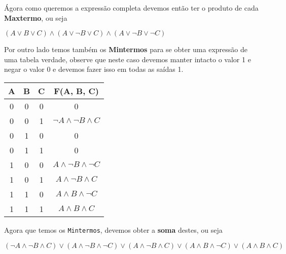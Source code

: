 \documentclass[12pt, onecolumn]{article}
\begin{document}
	Ágora como queremos a expressão completa devemos então ter 
	o produto de cada \textbf{Maxtermo}, ou seja \\
	\begin{center} 
		$ %
		(A \lor B \lor C) \land 
		(A \lor \lnot{B} \lor C) \land 
		(A \lor \lnot{B} \lor \lnot{C})
		$ 
	\end{center} 


	Por outro lado temos também os \textbf{Mintermos} para se obter 
	uma expressão de uma tabela verdade, observe que neste caso
	devemos manter intacto o valor 1 e negar o valor 0 e devemos fazer isso
	em todas as saídas 1. \\
        \begin{table}[ht]
                \centering
                \begin{tabular}{|c|c|c|c|}
                        \hline
                        A & B & C & F(A, B, C)\\ \hline

                        0 & 0 & 0 & 0 \\ \hline
			0 & 0 & 1 & $\lnot{A} \land \lnot{B} \land C$ \\ \hline %
                        0 & 1 & 0 & 0 \\ \hline
                        0 & 1 & 1 & 0 \\ \hline
			1 & 0 & 0 & $A \land \lnot{B} \land \lnot{C}$ \\ \hline %
			1 & 0 & 1 & $A \land \lnot{B} \land C$ \\ \hline %
			1 & 1 & 0 & $A \land B \land \lnot{C}$ \\ \hline %
                        1 & 1 & 1 & $A \land B \land C$ \\ \hline %
                \end{tabular} 
        \end{table}

	Agora que temos os \texttt{Mintermos}, devemos obter a \textbf{soma}
	destes, ou seja \\
	\begin{center}
		$  %
		(\lnot{A} \land \lnot{B} \land C) \lor 
		(A \land \lnot{B} \land \lnot{C}) \lor 
		(A \land \lnot{B} \land C) \lor 
		(A \land B \land \lnot{C}) \lor 
		(A \land B \land C) 
		$
	\end{center}
	
\end{document}
